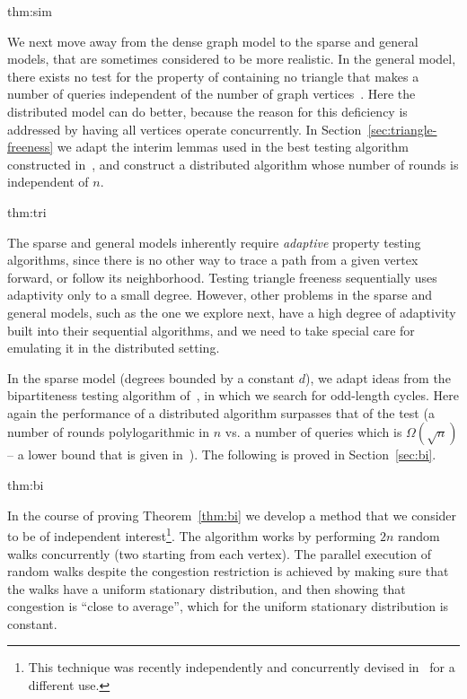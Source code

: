 \documentclass[11pt]{article}
\newenvironment{theorem-repeat}[1]{\begin{trivlist}
		\item[\hspace{\labelsep}{\bf\noindent Theorem \ref{#1} }]\em }{\end{trivlist}}
\begin{document}
\begin{theorem-repeat}{thm:sim}
\ThmSim
\end{theorem-repeat}

We next move away from the dense graph model to the sparse and general models, that are sometimes considered to be more realistic. In the general model, there exists no test for the property of containing no triangle that makes a number of queries independent of the number of graph vertices~\cite{AKKR}. Here the distributed model can do better, because the reason for this deficiency is addressed by having all vertices operate concurrently. In Section~\ref{sec:triangle-freeness} we adapt the interim lemmas used in the best testing algorithm constructed in~\cite{AKKR}, and construct a distributed algorithm whose number of rounds is independent of $n$.

\begin{theorem-repeat}{thm:tri}
\ThmTri
\end{theorem-repeat}

The sparse and general models inherently require \emph{adaptive} property testing algorithms, since there is no other way to trace a path from a given vertex forward, or follow its neighborhood. Testing triangle freeness sequentially uses adaptivity only to a small degree.
However, other problems in the sparse and general models, such as the one we explore next, have a high degree of adaptivity built into their sequential algorithms, and we need to take special care for emulating it in the distributed setting.

In the sparse model (degrees bounded by a constant $d$), we adapt ideas from the bipartiteness testing algorithm of~\cite{GR99}, in which we search for odd-length cycles. Here again the performance of a distributed algorithm surpasses that of the test (a number of rounds polylogarithmic in $n$ vs. a number of queries which is $\Omega(\sqrt{n})$ -- a lower bound that is given in~\cite{GoldreichR02}). The following is proved in Section~\ref{sec:bi}.

\begin{theorem-repeat}{thm:bi}
\ThmBi
\end{theorem-repeat}

In the course of proving Theorem~\ref{thm:bi} we develop a method that we consider to be of independent interest\footnote{This technique was recently independently and concurrently devised in~\cite{GhaffariKS16} for a different use.}. The algorithm works by performing $2n$ random walks concurrently (two starting from each vertex). The parallel execution of random walks despite the congestion restriction is achieved by making sure that the walks have a uniform stationary distribution, and then showing that congestion is ``close to average'', which for the uniform stationary distribution is constant.
\end{document}
